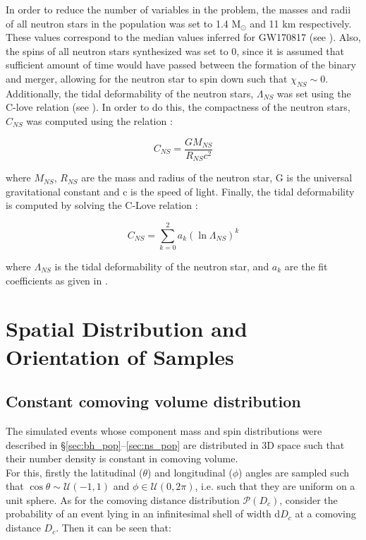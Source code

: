     In order to reduce the number of variables in the problem, the masses and radii of
    all neutron stars in the population was set to 1.4 M$_\odot$ and 11 km respectively.
    These values correspond to the median values inferred for GW170817 (see
    \cite{abbott_2018}). Also, the spins of all neutron stars synthesized was set to 0,
    since it is assumed that sufficient amount of time would have passed between the
    formation of the binary and merger, allowing for the neutron star to spin down such
    that $\chi_{NS} \sim 0$.\\
    Additionally, the tidal deformability of the neutron stars, $\Lambda_{NS}$ was set
    using the C-love relation (see \cite{yagi_2017}). In order to do this, the
    compactness of the neutron stars, $C_{NS}$ was computed using the relation :

    \begin{equation}
        C_{NS} = \dfrac{G M_{NS}}{R_{NS} c^2}
    \end{equation}

    where $M_{NS}$, $R_{NS}$ are the mass and radius of the neutron star, G is the
    universal gravitational constant and c is the speed of light.  Finally, the tidal
    deformability is computed by solving the C-Love relation :

    \begin{equation}
        C_{NS} = \sum_{k=0}^{2} a_k (\ln \Lambda_{NS})^k
    \end{equation}

    where $\Lambda_{NS}$ is the tidal deformability of the neutron star, and $a_k$ are
    the fit coefficients as given in \cite{yagi_2017}.

\section{Spatial Distribution and Orientation of Samples}\label{sec:space_dist}

    \subsection{Constant comoving volume distribution}

        The simulated events whose component mass and spin distributions were described
        in \S\ref{sec:bh_pop}--\ref{sec:ns_pop} are distributed in 3D space such that
        their number density is constant in comoving volume.\\ For this, firstly the
        latitudinal ($\theta$) and longitudinal ($\phi$) angles are sampled such that
        $\cos \theta \sim \mathcal{U}(-1, 1)$ and $\phi \in \mathcal{U}(0, 2\pi)$, i.e.
        such that they are uniform on a unit sphere. As for the comoving distance
        distribution $\mathcal{P}(D_c)$, consider the probability of an event lying in
        an infinitesimal shell of width d$D_c$ at a comoving distance $D_c$.  Then it
        can be seen that:

